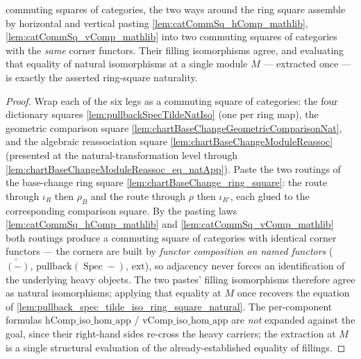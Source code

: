 \begin{lemma}
  commuting squares of categories, the two ways around the ring square assemble by horizontal and
  vertical pasting \cref{lem:catCommSq_hComp_mathlib}, \cref{lem:catCommSq_vComp_mathlib} into two
  commuting squares of categories with the \emph{same} corner functors. Their filling isomorphisms
  agree, and evaluating that equality of natural isomorphisms at a single module \(M\) — extracted once
  — is exactly the asserted ring-square naturality.
  \begin{proof}
    Wrap each of the six legs as a commuting square of categories: the four dictionary squares
    \cref{lem:pullbackSpecTildeNatIso} (one per ring map), the geometric comparison square
    \cref{lem:chartBaseChangeGeometricComparisonNat}, and the algebraic reassociation square
    \cref{lem:chartBaseChangeModuleReassoc} (presented at the natural-transformation level through
    \cref{lem:chartBaseChangeModuleReassoc_eq_natApp}). Paste the two routings of the base-change ring
    square \cref{lem:chartBaseChange_ring_square}: the route through \(\iota_R\) then \(\rho_B\) and the
    route through \(\rho\) then \(\iota_{R'}\), each glued to the corresponding comparison square. By the
    pasting laws \cref{lem:catCommSq_hComp_mathlib} and \cref{lem:catCommSq_vComp_mathlib} both routings
    produce a commuting square of categories with identical corner functors — the corners are built by
    \emph{functor composition on named functors} (\(\widetilde{(-)}\),
    \(\mathrm{pullback}(\operatorname{Spec}-)\), \(\mathrm{ext}\)), so adjacency never forces an
    identification of the underlying heavy objects. The two pastes' filling isomorphisms therefore agree
    as natural isomorphisms; applying that equality at \(M\) once recovers the equation of
    \cref{lem:pullback_spec_tilde_iso_ring_square_natural}. The per-component formulas
    \(\mathrm{hComp\_iso\_hom\_app}\) / \(\mathrm{vComp\_iso\_hom\_app}\) are \emph{not} expanded against
    the goal, since their right-hand sides re-cross the heavy carriers; the extraction at \(M\) is a
    single structural evaluation of the already-established equality of fillings.
  \end{proof}
\end{lemma}

